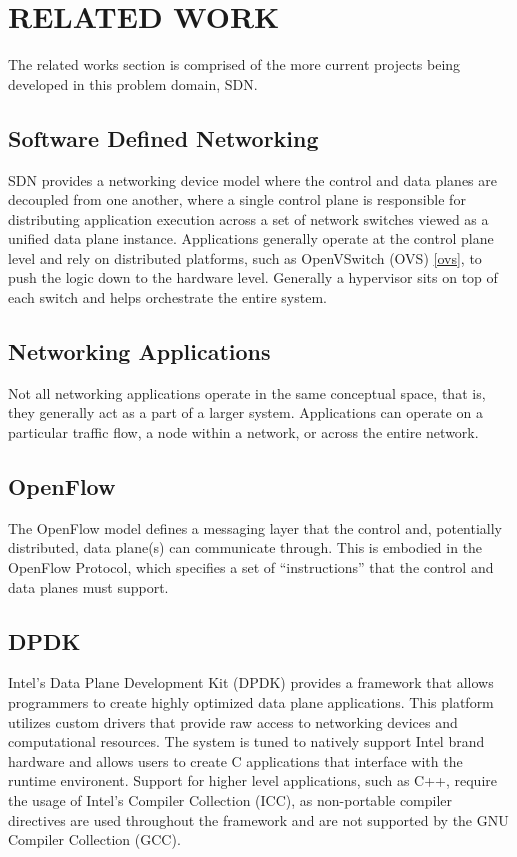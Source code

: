 \chapter{RELATED WORK}
\label{related}
The related works section is comprised of the more current projects being
developed in this problem domain, SDN.

\section{Software Defined Networking}
\label{related:sdn}
SDN provides a networking device model where the control and data planes are
decoupled from one another, where a single control plane is responsible for
distributing application execution across a set of network switches viewed as
a unified data plane instance. Applications generally operate at the control
plane level and rely on distributed platforms, such as OpenVSwitch (OVS)
\ref{ovs}, to push the logic down to the hardware level. Generally a hypervisor
sits on top of each switch and helps orchestrate the entire system.


\section{Networking Applications}
\label{related:apps}
Not all networking applications operate in the same conceptual space, that is,
they generally act as a part of a larger system. Applications can operate on a
particular traffic flow, a node within a network, or across the entire network.

\section{OpenFlow}
\label{related:of}
The OpenFlow \cite{openflow} model defines a messaging layer that the control
and, potentially distributed, data plane(s) can communicate through. This is
embodied in the OpenFlow Protocol, which specifies a set of ``instructions''
that the control and data planes must support.

\section{DPDK}
\label{related:dpdk}
Intel's Data Plane Development Kit (DPDK) \cite{dpdk} provides a framework that
allows programmers to create highly optimized data plane applications. This
platform utilizes custom drivers that provide raw access to networking devices
and computational resources. The system is tuned to natively support Intel
brand hardware and allows users to create C applications that interface with
the runtime environent. Support for higher level applications, such as C++,
require the usage of Intel's Compiler Collection (ICC), as non-portable compiler
directives are used throughout the framework and are not supported by the GNU
Compiler Collection (GCC).

